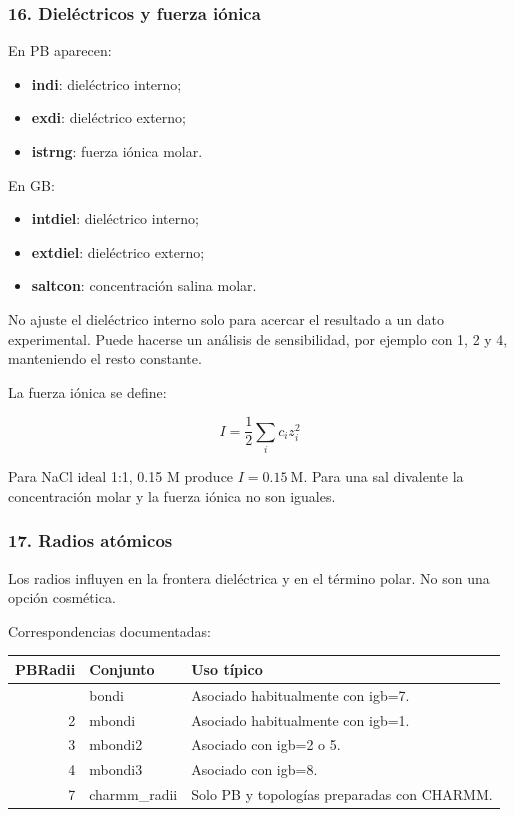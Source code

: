 \documentclass[
  spanish,
  11pt,
  a4paper]{article}
\newcounter{none} %
\providecommand{\tightlist}{%
  \setlength{\itemsep}{0pt}\setlength{\parskip}{0pt}}
\begin{document}
\subsubsection{16. Dieléctricos y fuerza
iónica}\label{dieluxe9ctricos-y-fuerza-iuxf3nica}

En PB aparecen:

\begin{itemize}
\tightlist
\item
  \textbf{indi}: dieléctrico interno;
\item
  \textbf{exdi}: dieléctrico externo;
\item
  \textbf{istrng}: fuerza iónica molar.
\end{itemize}

En GB:

\begin{itemize}
\tightlist
\item
  \textbf{intdiel}: dieléctrico interno;
\item
  \textbf{extdiel}: dieléctrico externo;
\item
  \textbf{saltcon}: concentración salina molar.
\end{itemize}

No ajuste el dieléctrico interno solo para acercar el resultado a un
dato experimental. Puede hacerse un análisis de sensibilidad, por
ejemplo con 1, 2 y 4, manteniendo el resto constante.

La fuerza iónica se define:

\[
I=\frac{1}{2}\sum_i c_i z_i^2
\]

Para NaCl ideal 1:1, 0.15 M produce \(I=0.15\ \mathrm{M}\). Para una sal
divalente la concentración molar y la fuerza iónica no son iguales.

\subsubsection{17. Radios atómicos}\label{radios-atuxf3micos}

Los radios influyen en la frontera dieléctrica y en el término polar. No
son una opción cosmética.

Correspondencias documentadas:

{\def\LTcaptype{none} %
\begin{longtable}[]{@{}rll@{}}
\toprule\noalign{}
PBRadii & Conjunto & Uso típico \\
\midrule\noalign{}
\endhead
\bottomrule\noalign{}
\endlastfoot
1 & bondi & Asociado habitualmente con igb=7. \\
2 & mbondi & Asociado habitualmente con igb=1. \\
3 & mbondi2 & Asociado con igb=2 o 5. \\
4 & mbondi3 & Asociado con igb=8. \\
7 & charmm\_radii & Solo PB y topologías preparadas con CHARMM. \\
\end{longtable}
}
\end{document}
